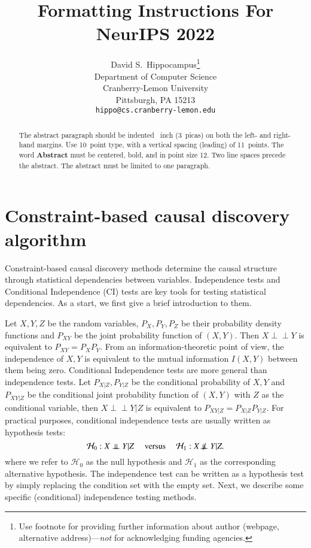 \documentclass{article}
\title{Formatting Instructions For NeurIPS 2022}
\author{%
  David S.~Hippocampus\thanks{Use footnote for providing further information
    about author (webpage, alternative address)---\emph{not} for acknowledging
    funding agencies.} \\
  Department of Computer Science\\
  Cranberry-Lemon University\\
  Pittsburgh, PA 15213 \\
  \texttt{hippo@cs.cranberry-lemon.edu} \\
}
\begin{document}
\maketitle


\begin{abstract}
  The abstract paragraph should be indented ~inch (3~picas) on
  both the left- and right-hand margins. Use 10~point type, with a vertical
  spacing (leading) of 11~points.  The word \textbf{Abstract} must be centered,
  bold, and in point size 12. Two line spaces precede the abstract. The abstract
  must be limited to one paragraph.
\end{abstract}


\section{Constraint-based causal discovery algorithm}
Constraint-based causal discovery methods determine the causal structure through statistical dependencies between variables. Independence tests and Conditional Independence (CI) tests are key tools for testing statistical dependencies. As a start, we first give a brief introduction to them.

Let $X,Y,Z$ be the random variables, $P_X,P_Y,P_Z$ be their probability density functions and $P_{XY}$ be the joint probability function of $(X,Y)$. Then $X\perp\!\!\!\perp Y$ is equivalent to $P_{XY}=P_XP_Y$. From an information-theoretic point of view, the independence of $X,Y$ is equivalent to the mutual information $I(X,Y)$ between them being zero. Conditional Independence tests are more general than independence tests. Let $P_{X|Z},P_{Y|Z}$ be the conditional probability of $X,Y$  and $P_{XY|Z}$ be the conditional joint probability function of $(X,Y)$ with $Z$ as the conditional variable, then $X\perp\!\!\!\perp Y|Z$ is equivalent to $P_{XY|Z} = P_{X|Z}P_{Y|Z}$. For practical purposes, conditional independence tests are usually written as hypothesis tests:
\begin{equation*}
	\mathcal{H}_0: X\perp\!\!\!\perp Y|Z ~~~~~\text{versus}~~~~~ \mathcal{H}_1: X\not\! \perp\!\!\!\perp Y|Z.
\end{equation*}
where we refer to $\mathcal{H}_0$ as the null hypothesis and $\mathcal{H}_1$ as the corresponding alternative hypothesis. The independence test can be written as a hypothesis test by simply replacing the condition set with the empty set.
Next, we describe some specific (conditional) independence testing methods.
\end{document}

